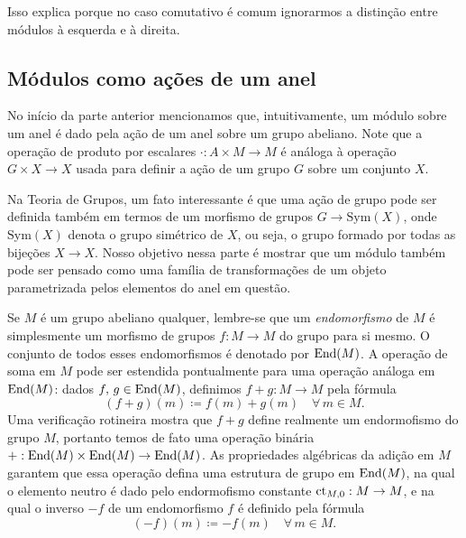 Isso explica porque no caso comutativo é comum ignorarmos a distinção entre módulos à esquerda e à direita.

\subsection{Módulos como ações de um anel}

No início da parte anterior mencionamos que, intuitivamente, um módulo sobre um anel é dado pela ação de um anel sobre  um grupo abeliano.
Note que a operação de produto por escalares $\cdot : A \times M \to M$ é análoga à operação $G \times X \to X$ usada para definir a ação de um grupo $G$ sobre um conjunto $X$.

Na Teoria de Grupos, um fato interessante é que uma ação de grupo pode ser definida também em termos de um morfismo de grupos $G \to \mathrm{Sym}(X)$, onde $\mathrm{Sym}(X)$ denota o grupo simétrico de $X$, ou seja, o grupo formado por todas as bijeções $X \to X$.
Nosso objetivo nessa parte é mostrar que um módulo também pode ser pensado como uma família de transformações de um objeto parametrizada pelos elementos do anel em questão.

Se $M$ é um grupo abeliano qualquer, lembre-se que um \emph{endomorfismo} de $M$ é simplesmente um morfismo de grupos $f: M \to M$ do grupo para si mesmo.
O conjunto de todos esses endomorfismos é denotado por $\mathrm{End}(M)$.
A operação de soma em $M$ pode ser estendida pontualmente para uma operação análoga em $\mathrm{End}(M)$: dados $f,\, g \in \mathrm{End}(M)$, definimos $f+g: M \to M$ pela fórmula
\begin{displaymath}
  (f+g)(m) \coloneqq f(m) + g(m) \quad \forall\, m \in M.
\end{displaymath}
Uma verificação rotineira mostra que $f+g$ define realmente um endormofismo do grupo $M$, portanto temos de fato uma operação binária $+: \mathrm{End}(M) \times \mathrm{End}(M) \to \mathrm{End}(M)$.
As propriedades algébricas da adição em $M$ garantem que essa operação defina uma estrutura de grupo em $\mathrm{End}(M)$, na qual o elemento neutro é dado pelo endormofismo constante $\mathrm{ct}_{M,0}: M \to M$, e na qual o inverso $-f$ de um endomorfismo $f$ é definido pela fórmula
\begin{displaymath}
  (-f)(m) \coloneqq -f(m) \quad \forall\, m \in M.
\end{displaymath}

